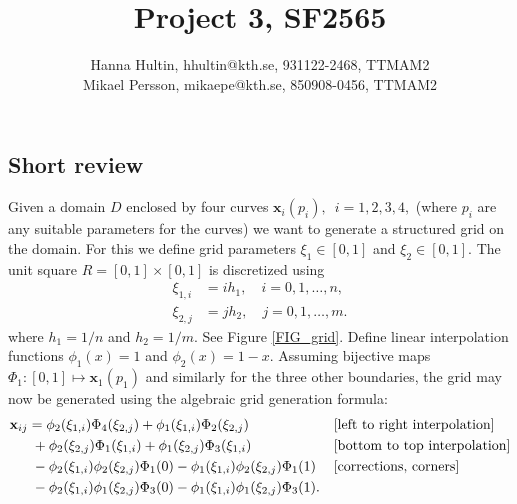 \documentclass[a4paper,10pt]{article}
\title{Project 3, SF2565}
\author{Hanna Hultin, hhultin@kth.se, 931122-2468, TTMAM2 \\ Mikael Persson, mikaepe@kth.se, 850908-0456, TTMAM2}
\newcommand{\ve}{\mathbf}
\begin{document}
\maketitle

\subsection*{Short review}
Given a domain $D$ enclosed by four curves $\ve{x}_i (p_i), \enspace i = 1,2,3,4,$  
(where $p_i$ are any suitable parameters for the curves)
we want to generate a structured grid on the domain.
For this we define grid parameters $\xi_1 \in [0,1]$ and $\xi_2 \in [0,1]$.
The unit square $R = [0,1]\times[0,1]$ is discretized using 
\begin{align*}
  \xi_{1,i} &= i h_1,\quad i = 0,1,\dots,n, \\
  \xi_{2,j} &= j h_2,\quad j = 0,1,\dots,m.
\end{align*}
where $h_1 = 1/n$ and $h_2 = 1/m$. See Figure \ref{FIG_grid}. Define linear interpolation functions $\phi_1(x) = 1$ and
$\phi_2(x) = 1-x$.
Assuming bijective maps $\Phi_1 : [0,1] \mapsto \ve{x}_1(p_1)$ and similarly for the three other
boundaries, the grid may now be generated using the algebraic grid generation formula:
\begin{align*}
  \ve{x}_{ij} &= \phi_2(\xi_{1,i}) \Phi_4 (\xi_{2,j}) + \phi_1(\xi_{1,i}) \Phi_2(\xi_{2,j}) 
  &&\text{[left to right interpolation]}\\
  &\hspace{1mm}+ \phi_2(\xi_{2,j}) \Phi_1(\xi_{1,i}) + \phi_1(\xi_{2,j}) \Phi_3(\xi_{1,i})
  &&\text{[bottom to top interpolation]} \\
  &\hspace{1mm}- \phi_2(\xi_{1,i}) \phi_2(\xi_{2,j}) \Phi_1(0) - 
  \phi_1(\xi_{1,i}) \phi_2(\xi_{2,j}) \Phi_1(1) 
  &&\text{[corrections, corners]}\\
  &\hspace{1mm}- \phi_2(\xi_{1,i}) \phi_1(\xi_{2,j}) \Phi_3(0) -
  \phi_1(\xi_{1,i}) \phi_1(\xi_{2,j}) \Phi_3(1)
  .
\end{align*}
\end{document}
